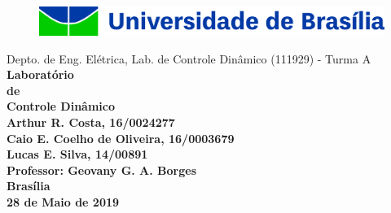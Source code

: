 \begin{titlepage}
\Centering
    \begin{figure}
        \includegraphics[width = 130mm]{Figuras/unb.jpg}
    \end{figure}
    {Depto. de Eng. Elétrica, Lab. de Controle Dinâmico (111929) - Turma A}\\
    
    \vfill
    \bf \Huge Laboratório\\ de\\ Controle Dinâmico\\

    \vfill                                              %
    \normalfont \normalsize                             %
    Arthur R. Costa, 16/0024277\\
    Caio E. Coelho de Oliveira, 16/0003679\\
    Lucas E. Silva, 14/00891 \\ [5mm]
    Professor: Geovany G. A. Borges\\
    
    \vfill \Centering
    \bf \large
    Brasília \\ 28 de Maio de 2019
\end{titlepage}